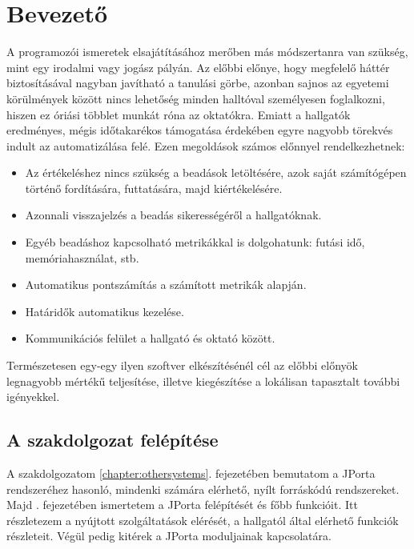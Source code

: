 \chapter*{Bevezető}

A programozói ismeretek elsajátításához merőben más módszertanra van szükség, mint egy irodalmi vagy jogász pályán. Az előbbi előnye, hogy megfelelő háttér biztosításával nagyban javítható a tanulási görbe, azonban sajnos az egyetemi körülmények között nincs lehetőség minden halltóval személyesen foglalkozni, hiszen ez óriási többlet munkát róna az oktatókra. Emiatt a hallgatók eredményes, mégis időtakarékos támogatása érdekében egyre nagyobb törekvés indult az automatizálása felé. Ezen megoldások számos előnnyel rendelkezhetnek:

\begin{itemize}
    \item Az értékeléshez nincs szükség a beadások letöltésére, azok saját számítógépen történő fordítására, futtatására, majd kiértékelésére.
    \item Azonnali visszajelzés a beadás sikerességéről a hallgatóknak.
    \item Egyéb beadáshoz kapcsolható metrikákkal is dolgohatunk: futási idő, memóriahasználat, stb.
    \item Automatikus pontszámítás a számított metrikák alapján.
    \item Határidők automatikus kezelése.
    \item Kommunikációs felület a hallgató és oktató között.
\end{itemize}

Természetesen egy-egy ilyen szoftver elkészítésénél cél az előbbi előnyök legnagyobb mértékű teljesítése, illetve kiegészítése a lokálisan tapasztalt további igényekkel.

\section*{A szakdolgozat felépítése}
A szakdolgozatom \ref{chapter:othersystems}. fejezetében bemutatom a JPorta rendszeréhez hasonló,  mindenki számára elérhető, nyílt forráskódú rendszereket. Majd . fejezetében ismertetem a JPorta felépítését és főbb funkcióit. Itt részletezem a nyújtott szolgáltatások elérését, a hallgatól által elérhető funkciók részleteit. Végül pedig kitérek a JPorta moduljainak kapcsolatára.

